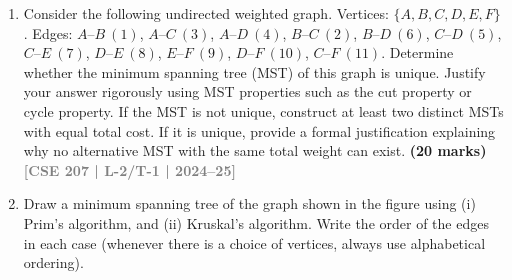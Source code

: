 \documentclass[12pt]{article}
\newcommand{\yr}[1]{\hfill\textcolor{gray}{\small\textbf{[#1]}}}
\newcommand{\mk}[1]{\textcolor{orange!70!black}{\small\textbf{(#1 marks)}}}
\begin{document}
\begin{enumerate}

\item Consider the following undirected weighted graph. Vertices: $\{A, B, C, D, E, F\}$. Edges: $A$--$B\ (1)$, $A$--$C\ (3)$, $A$--$D\ (4)$, $B$--$C\ (2)$, $B$--$D\ (6)$, $C$--$D\ (5)$, $C$--$E\ (7)$, $D$--$E\ (8)$, $E$--$F\ (9)$, $D$--$F\ (10)$, $C$--$F\ (11)$. Determine whether the minimum spanning tree (MST) of this graph is unique. Justify your answer rigorously using MST properties such as the cut property or cycle property. If the MST is not unique, construct at least two distinct MSTs with equal total cost. If it is unique, provide a formal justification explaining why no alternative MST with the same total weight can exist.
\mk{20} \yr{CSE 207 | L-2/T-1 | 2024--25}


\item Draw a minimum spanning tree of the graph shown in the figure using (i) Prim's algorithm, and (ii) Kruskal's algorithm. Write the order of the edges in each case (whenever there is a choice of vertices, always use alphabetical ordering).
\begin{center}
\end{center}
\end{enumerate}
\end{document}
